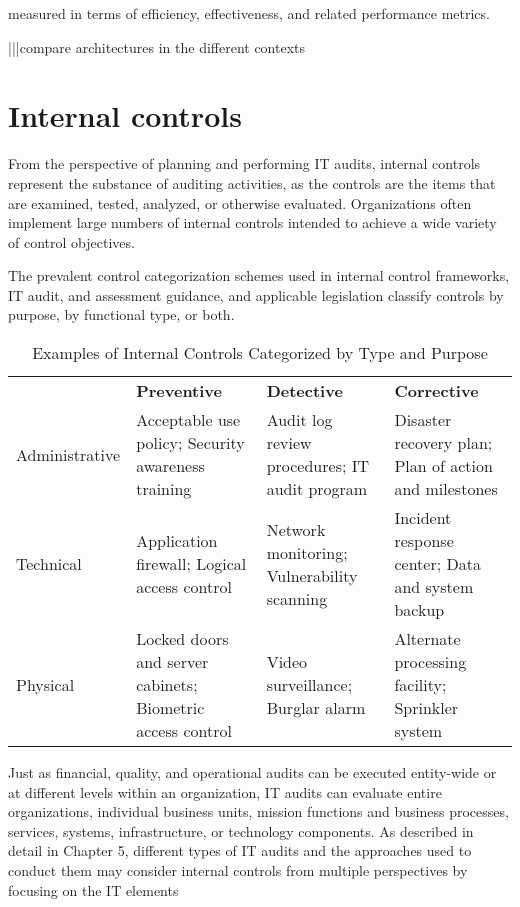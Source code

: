 measured in terms of efficiency, effectiveness, and related performance metrics. 

|||compare architectures in the different contexts

\section{Internal controls}\label{sec:adt:internal-controls}

From the perspective of planning and performing IT audits, internal controls
represent the substance of auditing activities, as the controls are the items that are
examined, tested, analyzed, or otherwise evaluated. Organizations often implement
large numbers of internal controls intended to achieve a wide variety of control
objectives.

The prevalent control categorization schemes used in internal control frameworks,
IT audit, and assessment guidance, and applicable legislation classify controls by
purpose, by functional type, or both.

\begin{table}[H]
  \begin{center}
    \caption{Examples of Internal Controls Categorized by Type and Purpose}
    \label{tab:eicctp}
    \def\arraystretch{1.5}
    \begin{tabularx}{\linewidth}{|l X X X |}
      \hline
      \rowcolor{gray!20}
      \textbf{} & \textbf{Preventive} & \textbf{Detective} & \textbf{Corrective}\\
      Administrative & Acceptable use policy; Security awareness training & Audit log review procedures; IT audit program & Disaster recovery plan; Plan of action and milestones\\
      Technical & Application firewall; Logical access control & Network monitoring; Vulnerability scanning & Incident response center; Data and system backup\\
      Physical & Locked doors and server cabinets; Biometric access control& Video surveillance; Burglar alarm & Alternate processing facility; Sprinkler system\\
      \hline
    \end{tabularx}
  \end{center}
\end{table}

Just as financial, quality, and operational audits can be executed entity-wide or at
different levels within an organization, IT audits can evaluate entire organizations,
individual business units, mission functions and business processes, services, systems, infrastructure, or technology components. As described in detail in Chapter 5,
different types of IT audits and the approaches used to conduct them may consider internal controls from multiple perspectives by focusing on the IT elements

